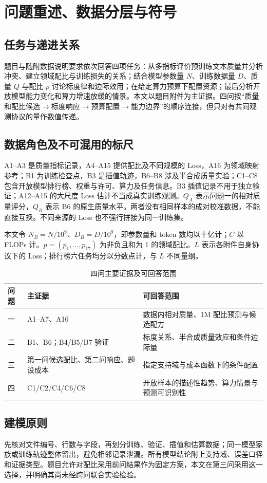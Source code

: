 \section{问题重述、数据分层与符号}
\subsection{任务与递进关系}
题目与随附数据说明\cite{problem}要求依次回答四项任务：从多指标评价预训练文本质量并分析冲突、建立领域配比与训练损失的关系；结合模型参数量 $N$、训练数据量 $D$、质量 $Q$ 与配比 $p$ 讨论标度律和边际效用；在给定算力预算下配置资源；最后分析开放模型能力变化和算力增速放缓的情景。本文以题目附件为主证据。四问按“质量和配比候选$\rightarrow$标度响应$\rightarrow$预算配置$\rightarrow$能力边界”的顺序连接，但只对有共同观测协议的量作数值传递。

\subsection{数据角色及不可混用的标尺}
A1--A3 是质量指标记录，A4--A15 提供配比及不同规模的 Loss，A16 为领域映射参考；B1 为训练检查点，B3 是插值轨迹，B6--B8 涉及半合成质量实验；C1--C8 包含开放模型排行榜、权重与许可、算力及任务信息。B3 插值记录不用于独立验证；A12--A15 的大尺度 Loss 估计不当成真实训练观测。$Q_A$ 表示问题一的相对质量评分，$Q_B$ 表示 B6 的原生质量水平。两者没有相同样本的成对校准数据，不能直接互换。不同来源的 Loss 也不强行拼接为同一训练集。

本文令 $N_B=N/10^9$、$D_B=D/10^9$，即参数量和 token 数均以十亿计；$C$ 以 FLOPs 计。$p=(p_1,\ldots,p_{17})$ 为非负且和为 1 的领域配比。$L$ 表示各附件自身协议下的 Loss；排行榜六任务均分以分数点计，与 $L$ 不同量纲。

\begin{table}[htbp]\centering\caption{四问主要证据及可回答范围}
\small\begin{tabular}{p{1.3cm}p{3.1cm}p{7.3cm}}\toprule
问题 & 主证据 & 可回答范围\\\midrule
一 & A1--A7、A16 & 数据内相对质量、1M 配比预测与候选配方\\
二 & B1、B6；B4/B5/B7 验证 & 标度关系、半合成质量效应和条件边际量\\
三 & 第一问候选配比、第二问响应、题设成本 & 指定支持域与成本函数下的条件配置\\
四 & C1/C2/C4/C6/C8 & 开放样本的描述性趋势、算力情景与预测可识别性\\\bottomrule
\end{tabular}\end{table}

\subsection{建模原则}
先核对文件编号、行数与字段，再划分训练、验证、插值和估算数据；同一模型家族或训练轨迹整体留出，避免相邻记录泄漏。所有模型结论附上支持域、误差口径和证据类型。题目允许对配比采用前问结果作为固定方案，本文在第三问采用这一选择，并明确其尚未经跨问联合实验检验。
